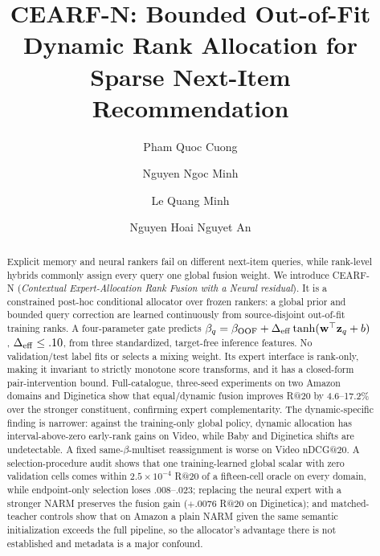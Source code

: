 \documentclass[runningheads]{llncs}
\newcommand{\method}{CEARF-N}
\begin{document}
\title{\method{}: Bounded Out-of-Fit Dynamic Rank Allocation for Sparse
Next-Item Recommendation}
\author{Pham Quoc Cuong \and
Nguyen Ngoc Minh \and
Le Quang Minh \and
Nguyen Hoai Nguyet An}
\maketitle

\begin{abstract}
Explicit memory and neural rankers fail on different next-item queries, while
rank-level hybrids commonly assign every query one global fusion weight. We
introduce \method{} (\emph{Contextual Expert-Allocation Rank Fusion with a
Neural residual}).
It is a constrained post-hoc conditional allocator over frozen rankers:
a global prior and bounded query correction are learned continuously from
source-disjoint out-of-fit training ranks. A four-parameter gate predicts
$\beta_q=\beta_{\mathrm{OOF}}+\Delta_{\rm eff}
\tanh(\mathbf w^\top\mathbf z_q+b)$,
$\Delta_{\rm eff}\leq.10$, from three standardized, target-free inference
features. No validation/test label fits or selects a mixing weight.
Its expert interface is rank-only, making it invariant to strictly monotone
score transforms, and it has a closed-form pair-intervention bound.
Full-catalogue, three-seed experiments on two Amazon domains and Diginetica
show that equal/dynamic fusion improves R@20 by 4.6--17.2\% over the stronger
constituent, confirming expert complementarity. The dynamic-specific finding
is narrower: against the training-only global policy, dynamic allocation has
interval-above-zero early-rank gains on Video, while Baby and Diginetica shifts
are undetectable. A fixed same-$\beta$-multiset reassignment is worse on Video
nDCG@20. A selection-procedure audit shows that one training-learned global
scalar with zero validation cells comes within $2.5\times10^{-4}$ R@20 of a
fifteen-cell oracle on every domain, while endpoint-only selection loses
$.008$--$.023$; replacing the neural expert with a stronger NARM preserves
the fusion gain ($+.0076$ R@20 on Diginetica); and matched-teacher controls
show that on Amazon a plain NARM given the same semantic initialization
exceeds the full pipeline, so the allocator's advantage there is not
established and metadata is a major confound.
\end{abstract}
\end{document}
